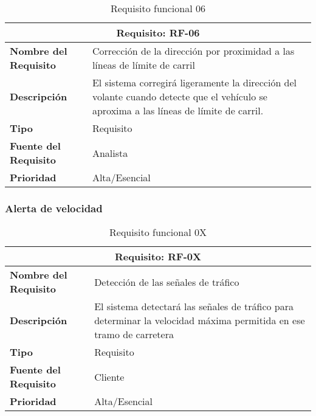 \documentclass[10pt,a4paper,oldfontcommands]{dpds}
\begin{document}
\begin{table}[H]
\begin{center}
\begin{tabular}{p{} p{7cm}}
\multicolumn{2}{c}{\textbf{Requisito: RF-06} } \\
\hline \hline
\textbf{Nombre del Requisito} &  Corrección de la dirección por proximidad a las líneas de límite de carril\\
\textbf{Descripción} & El sistema corregirá ligeramente la dirección del volante cuando detecte que el vehículo se aproxima a las líneas de límite de carril. \\
\textbf{Tipo} & Requisito  \\
\textbf{Fuente del Requisito} & Analista  \\
\textbf{Prioridad} & Alta/Esencial  \\ \hline
\end{tabular}
\caption{Requisito funcional 06}
\label{tab:RF-06}
\end{center}
\end{table}

\subsubsection{Alerta de velocidad}

\begin{table}[h]
\begin{center}
\begin{tabular}{p{} p{7cm}}
\multicolumn{2}{c}{\textbf{Requisito: RF-0X} } \\
\hline \hline
\textbf{Nombre del Requisito} & Detección de las señales de tráfico \\
\textbf{Descripción} & El sistema detectará las señales de tráfico para determinar la velocidad máxima permitida en ese tramo de carretera \\
\textbf{Tipo} & Requisito  \\
\textbf{Fuente del Requisito} & Cliente  \\
\textbf{Prioridad} & Alta/Esencial  \\ \hline
\end{tabular}
\caption{Requisito funcional 0X}
\label{tab:personal}
\end{center}
\end{table}
\end{document}
